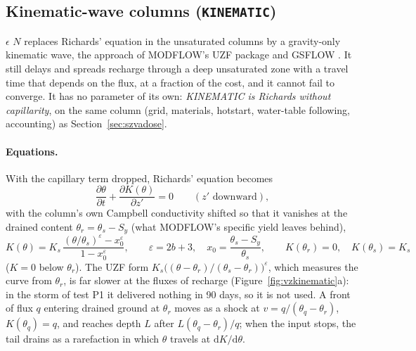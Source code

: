 \subsection{Kinematic-wave columns (\texttt{KINEMATIC})}\label{sec:szvadosekw}
 $\epsilon$ $N$ replaces Richards' equation in the unsaturated columns by a gravity-only
kinematic wave, the approach of MODFLOW's UZF package and GSFLOW \cite{markstrom2008gsflow}. It still delays and spreads
recharge through a deep unsaturated zone with a travel time that depends on the flux, at a fraction of the cost, and it
cannot fail to converge. It has no parameter of its own: \emph{KINEMATIC is Richards without capillarity}, on the same
column (grid, materials, hotstart, water-table following, accounting) as Section~\ref{sec:szvadose}.

\paragraph{Equations.} With the capillary term dropped, Richards' equation becomes
\begin{equation}
\frac{\partial\theta}{\partial t}+\frac{\partial K(\theta)}{\partial z'}=0\qquad(z'\text{ downward}),
\end{equation}
with the column's own Campbell conductivity shifted so that it vanishes at the drained content
$\theta_r=\theta_s-S_y$ (what MODFLOW's specific yield leaves behind),
\begin{equation}
K(\theta)=K_s\,\frac{(\theta/\theta_s)^{\varepsilon}-x_0^{\varepsilon}}{1-x_0^{\varepsilon}},\qquad
\varepsilon=2b+3,\quad x_0=\frac{\theta_s-S_y}{\theta_s},\qquad K(\theta_r)=0,\quad K(\theta_s)=K_s
\label{eq:kwK}
\end{equation}
($K=0$ below $\theta_r$). The UZF form $K_s\big((\theta-\theta_r)/(\theta_s-\theta_r)\big)^{\varepsilon}$, which measures
the curve from $\theta_r$, is far slower at the fluxes of recharge (Figure~\ref{fig:vzkinematic}a): in the storm of
test P1 it delivered nothing in 90 days, so it is not used. A front of flux $q$ entering drained ground at $\theta_r$
moves as a shock at $v=q/(\theta_q-\theta_r)$, $K(\theta_q)=q$, and reaches depth $L$ after $L(\theta_q-\theta_r)/q$;
when the input stops, the tail drains as a rarefaction in which $\theta$ travels at $\mathrm{d}K/\mathrm{d}\theta$.

